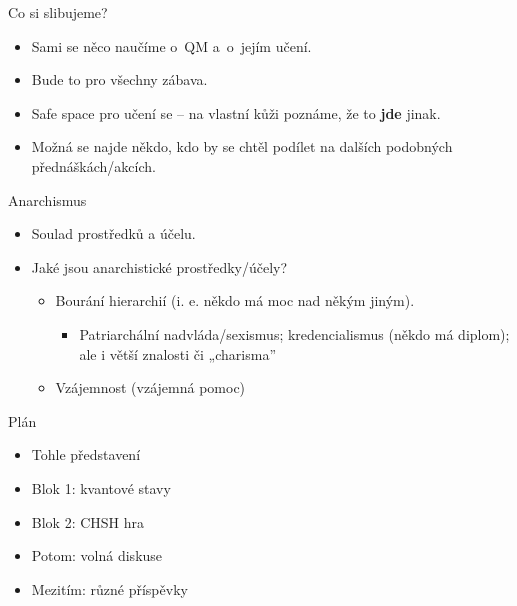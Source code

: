 \documentclass[11pt,t]{beamer}
\newenvironment{slidecontent}
	{\vspace*{\fill}
	}
	{
	\vspace*{\fill}
}
\newenvironment{slidetitle}
	{\vspace*{0.5cm}\hspace*{.2cm}\Huge
	}
	{
	\vspace*{0.6cm}
}
\begin{document}
{
\begin{frame}[plain]
\begin{slidetitle}
Co si slibujeme?
\end{slidetitle}
\begin{slidecontent}
\begin{itemize}
\item Sami se něco naučíme o~QM a~o~jejím učení.
\item Bude to pro všechny zábava.
\item Safe space pro učení se -- na vlastní kůži poznáme, že to \textbf{jde} jinak.
\item Možná se najde někdo, kdo by se chtěl podílet na dalších podobných přednáškách/akcích.
\end{itemize}
\end{slidecontent}
\end{frame}
}

{
\begin{frame}[plain]
\begin{slidetitle}
Anarchismus
\end{slidetitle}
\begin{slidecontent}
\begin{itemize}
\item Soulad prostředků a účelu.
\pause
\item Jaké jsou anarchistické prostředky/účely?
\begin{itemize}
\item Bourání hierarchií (i. e. někdo má moc nad někým jiným).
\begin{itemize}
\item Patriarchální nadvláda/sexismus; kredencialismus (někdo má diplom); ale i
větší znalosti či „charisma”
\end{itemize}
\item Vzájemnost (vzájemná pomoc)
\end{itemize}
\end{itemize}
\end{slidecontent}
\end{frame}
}





{
\begin{frame}[plain]
\begin{slidetitle}
Plán
\end{slidetitle}
\begin{slidecontent}
\begin{itemize}
\item Tohle představení
\item Blok 1: kvantové stavy
\item Blok 2: CHSH hra
\item Potom: volná diskuse
\item Mezitím: různé příspěvky
\end{itemize}
\end{slidecontent}
\end{frame}
}
\end{document}

